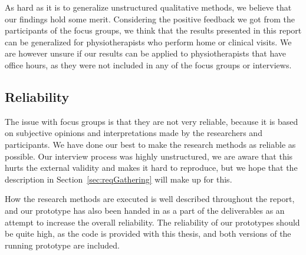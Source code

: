As hard as it is to generalize unstructured qualitative methods, we believe that our findings hold some merit. Considering the positive feedback we got from the participants of the focus groups, we think that the results presented in this report can be generalized for physiotherapists who perform home or clinical visits. We are however unsure if our results can be applied to physiotherapists that have office hours, as they were not included in any of the focus groups or interviews.

\subsection{Reliability}
The issue with focus groups is that they are not very reliable, because it is based on subjective opinions and interpretations made by the researchers and participants. We have done our best to make the research methods as reliable as possible. Our interview process was highly unstructured, we are aware that this hurts the external validity and makes it hard to reproduce, but we hope that the description in Section~\ref{sec:reqGathering} will make up for this. 

How the research methods are executed is well described throughout the report, and our prototype has also been handed in as a part of the deliverables as an attempt to increase the overall reliability. The reliability of our prototypes should be quite high, as the code is provided with this thesis, and both versions of the running prototype are included.
